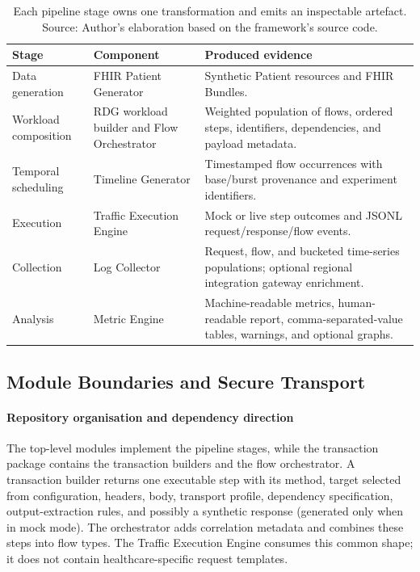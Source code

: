 \begin{table}[H]
    \centering
    \caption[Pipeline artefact transformation]{Each pipeline stage owns one transformation and emits an inspectable artefact. Source: Author's elaboration based on the framework's source code.}
    \small
    \setlength{\tabcolsep}{3pt}
    \begin{tabular}{|p{3.4cm}|p{3.4cm}|p{5.8cm}|}
        \hline
        \rowcolor{veryPeri!18}
        \textbf{Stage} & \textbf{Component} & \textbf{Produced evidence} \\
        \hline
        \rowcolor{tableGray}
        Data generation & FHIR Patient Generator & Synthetic Patient resources and FHIR Bundles. \\
        \hline
        Workload composition & RDG workload builder and Flow Orchestrator & Weighted population of flows, ordered steps, identifiers, dependencies, and payload metadata. \\
        \hline
        \rowcolor{tableGray}
        Temporal scheduling & Timeline Generator & Timestamped flow occurrences with base/burst provenance and experiment identifiers. \\
        \hline
        Execution & Traffic Execution Engine & Mock or live step outcomes and JSONL request/response/flow events. \\
        \hline
        \rowcolor{tableGray}
        Collection & Log Collector & Request, flow, and bucketed time-series populations; optional regional integration gateway enrichment. \\
        \hline
        Analysis & Metric Engine & Machine-readable metrics, human-readable report, comma-separated-value tables, warnings, and optional graphs. \\
        \hline
    \end{tabular}
    \label{tab:rdg-pipeline}
\end{table}

\subsection{Module Boundaries and Secure Transport}
\label{subsec:rdg-boundaries-transport}

\paragraph{Repository organisation and dependency direction}
\noindent The top-level modules implement the pipeline stages, while the transaction
package contains the transaction builders and the flow
orchestrator. A transaction builder returns one executable step with its
method, target selected from configuration, headers, body, transport profile,
dependency specification, output-extraction rules, and possibly a
synthetic response (generated only when in mock mode). The orchestrator adds correlation metadata and combines
these steps into flow types. The Traffic Execution Engine consumes this common shape;
it does not contain healthcare-specific request templates.

